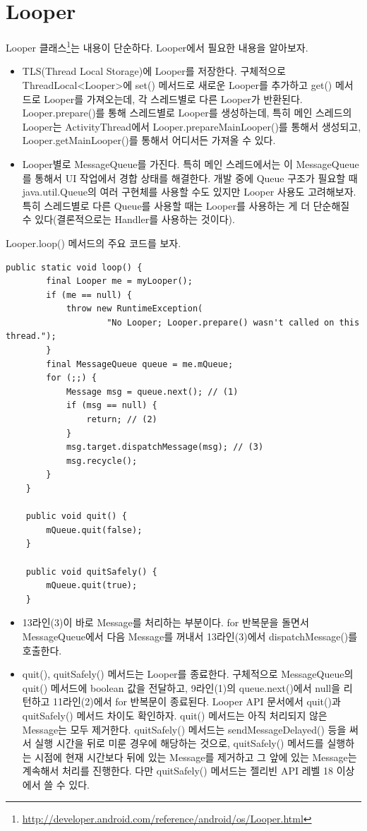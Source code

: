 \section{Looper}
Looper 클래스\footnote{\url{http://developer.android.com/reference/android/os/Looper.html}}는 내용이 단순하다. Looper에서 필요한 내용을 알아보자.
\begin{itemize}
\item TLS(Thread Local Storage)에 Looper를 저장한다. 
구체적으로 ThreadLocal<Looper>에 set() 메서드로 새로운 Looper를 추가하고 get() 메서드로 Looper를 가져오는데, 각 스레드별로 다른 Looper가 반환된다.
Looper.prepare()를 통해 스레드별로 Looper를 생성하는데, 특히 메인 스레드의 Looper는 ActivityThread에서 Looper.prepareMainLooper()를 통해서 생성되고, Looper.getMainLooper()를 통해서 어디서든 가져올 수 있다.

\item Looper별로 MessageQueue를 가진다. 
특히 메인 스레드에서는 이 MessageQueue를 통해서 UI 작업에서 경합 상태를 해결한다. 
개발 중에 Queue 구조가 필요할 때 java.util.Queue의 여러 구현체를 사용할 수도 있지만 Looper 사용도 고려해보자. 
특히 스레드별로 다른 Queue를 사용할 때는 Looper를 사용하는 게 더 단순해질 수 있다(결론적으로는 Handler를 사용하는 것이다).
\end{itemize}

Looper.loop() 메서드의 주요 코드를 보자.
\begin{lstlisting}[frame=single, caption=Looper.java] 
	public static void loop() {
		final Looper me = myLooper();
		if (me == null) {
			throw new RuntimeException(
					"No Looper; Looper.prepare() wasn't called on this thread.");
		}
		final MessageQueue queue = me.mQueue;
		for (;;) {
			Message msg = queue.next(); // (1)
			if (msg == null) {
				return; // (2)
			}
			msg.target.dispatchMessage(msg); // (3)
			msg.recycle();
		}
	}
	
	public void quit() {
        mQueue.quit(false);
    }
    
    public void quitSafely() {
        mQueue.quit(true);
    }
\end{lstlisting}	
\begin{itemize}
\item 13라인(3)이 바로 Message를 처리하는 부분이다. 
for 반복문을 돌면서 MessageQueue에서 다음 Message를 꺼내서 13라인(3)에서 dispatchMessage()를 호출한다. 

\item quit(), quitSafely() 메서드는 Looper를 종료한다. 
구체적으로 MessageQueue의 quit() 메서드에 boolean 값을 전달하고, 9라인(1)의 queue.next()에서 null을 리턴하고 11라인(2)에서 for 반복문이 종료된다.
Looper API 문서에서 quit()과 quitSafely() 메서드 차이도 확인하자.
quit() 메서드는 아직 처리되지 않은 Message는 모두 제거한다.
quitSafely() 메서드는 sendMessageDelayed() 등을 써서 실행 시간을 뒤로 미룬 경우에 해당하는 것으로, quitSafely() 메서드를 실행하는 시점에 현재 시간보다 뒤에 있는 Message를 제거하고 그 앞에 있는 Message는 계속해서 처리를 진행한다. 다만 quitSafely() 메서드는 젤리빈 API 레벨 18 이상에서 쓸 수 있다.
\end{itemize}

